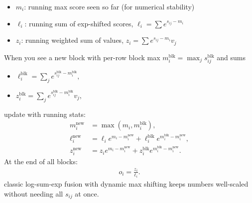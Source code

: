 \begin{itemize}
	\item $m_i$: running max score seen so far (for numerical stability)
	\item $\ell_i$: running sum of exp-shifted scores, \ie $\ell_i = \sum e^{s_{ij}-m_i}$
	\item $z_i$: running weighted sum of values, $z_i = \sum e^{s_{ij}-m_i} v_j$
\end{itemize}
When you see a new block with per-row block max $m_i^{\text{blk}}=\max_j s_{ij}^{\text{blk}}$ and sums
\begin{itemize}
	\item $\ell_i^{\text{blk}} = \sum_j e^{s_{ij}^{\text{blk}}-m_i^{\text{blk}}},$
	\item $z_i^{\text{blk}} = \sum_j e^{s_{ij}^{\text{blk}}-m_i^{\text{blk}}} v_j,$
\end{itemize}
update with running stats:
\begin{align*}
	m_i^{\text{new}} &= \max(m_i, m_i^{\text{blk}}),\\
	\ell_i^{\text{new}} &= \ell_i e^{m_i - m_i^{\text{new}}}
	+
	\ell_i^{\text{blk}} e^{m_i^{\text{blk}} - m_i^{\text{new}}},\\
	z_i^{\text{new}} &= z_i e^{m_i - m_i^{\text{new}}}
	+
	z_i^{\text{blk}} e^{m_i^{\text{blk}} - m_i^{\text{new}}}.
\end{align*}
At the end of all blocks:
\begin{align*}
	o_i = \frac{z_i}{\ell_i}.
\end{align*}
classic log-sum-exp fusion with dynamic max shifting keeps numbers well-scaled without needing all $s_{ij}$ at once.


